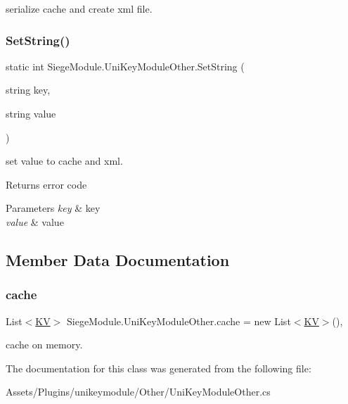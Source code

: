 serialize cache and create xml file. 

\mbox{\label{class_siege_module_1_1_uni_key_module_other_a3c863fcdc7762d02692f88f18240ed4c}} 
\subsubsection{\texorpdfstring{Set\+String()}{SetString()}}
{\footnotesize\ttfamily static int Siege\+Module.\+Uni\+Key\+Module\+Other.\+Set\+String (\begin{DoxyParamCaption}\item[{string}]{key,  }\item[{string}]{value }\end{DoxyParamCaption})\hspace{0.3cm}{\ttfamily [static]}}



set value to cache and xml. 

\begin{DoxyReturn}{Returns}
error code
\end{DoxyReturn}

\begin{DoxyParams}{Parameters}
{\em key} & key\\
\hline
{\em value} & value\\
\hline
\end{DoxyParams}


\subsection{Member Data Documentation}
\mbox{\label{class_siege_module_1_1_uni_key_module_other_ad7b2adc7e9aae7e1bce9cda54ffd4f40}} 
\subsubsection{\texorpdfstring{cache}{cache}}
{\footnotesize\ttfamily List$<$\mbox{\hyperlink{struct_siege_module_1_1_uni_key_module_other_1_1_k_v}{KV}}$>$ Siege\+Module.\+Uni\+Key\+Module\+Other.\+cache = new List$<$\mbox{\hyperlink{struct_siege_module_1_1_uni_key_module_other_1_1_k_v}{KV}}$>$()\hspace{0.3cm}{\ttfamily [static]}, {\ttfamily [private]}}



cache on memory. 



The documentation for this class was generated from the following file\+:\begin{DoxyCompactItemize}
\item 
Assets/\+Plugins/unikeymodule/\+Other/Uni\+Key\+Module\+Other.\+cs\end{DoxyCompactItemize}
